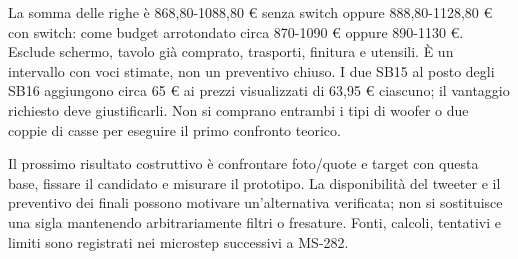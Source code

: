 \documentclass[
  italian,
  11pt,
  a4paper,
]{article}
\begin{document}
La somma delle righe è 868,80-1088,80 € senza switch oppure 888,80-1128,80 € con switch:
come budget arrotondato circa 870-1090 € oppure 890-1130 €. Esclude schermo, tavolo già
comprato, trasporti, finitura e utensili. È un intervallo con voci stimate, non un
preventivo chiuso. I due SB15 al posto degli SB16 aggiungono circa 65 € ai prezzi
visualizzati di 63,95 € ciascuno; il vantaggio richiesto deve giustificarli. Non si comprano
entrambi i tipi di woofer o due coppie di casse per eseguire il primo confronto teorico.

Il prossimo risultato costruttivo è confrontare foto/quote e target con questa base, fissare
il candidato e misurare il prototipo. La disponibilità del tweeter e il preventivo dei
finali possono motivare un'alternativa verificata; non si sostituisce una sigla mantenendo
arbitrariamente filtri o fresature. Fonti, calcoli, tentativi e limiti sono registrati nei
microstep successivi a MS-282.
\end{document}
